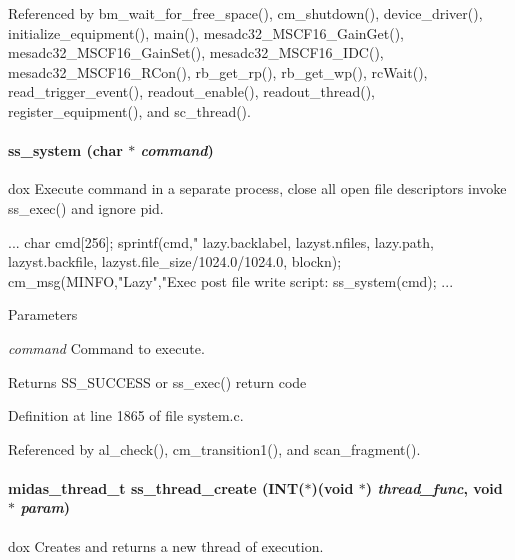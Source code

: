 Referenced by bm\_\-wait\_\-for\_\-free\_\-space(), cm\_\-shutdown(), device\_\-driver(), initialize\_\-equipment(), main(), mesadc32\_\-MSCF16\_\-GainGet(), mesadc32\_\-MSCF16\_\-GainSet(), mesadc32\_\-MSCF16\_\-IDC(), mesadc32\_\-MSCF16\_\-RCon(), rb\_\-get\_\-rp(), rb\_\-get\_\-wp(), rcWait(), read\_\-trigger\_\-event(), readout\_\-enable(), readout\_\-thread(), register\_\-equipment(), and sc\_\-thread().
\paragraph[{ss\_\-system}]{ ss\_\-system (char $\ast$ {\em command})}\hfill\label{group__msfunctionc_ga9b90d0865a3eb4720bd39edcaba9edba}
dox Execute command in a separate process, close all open file descriptors invoke ss\_\-exec() and ignore pid. 
\begin{DoxyCode}
{ ...
  char cmd[256];
  sprintf(cmd,"%
     lazy.backlabel, lazyst.nfiles, lazy.path, lazyst.backfile,
     lazyst.file_size/1024.0/1024.0, blockn);
  cm_msg(MINFO,"Lazy","Exec post file write script:%
  ss_system(cmd);
}
...
\end{DoxyCode}
 
\begin{DoxyParams}{Parameters}
\item[{\em command}]Command to execute. \end{DoxyParams}
\begin{DoxyReturn}{Returns}
SS\_\-SUCCESS or ss\_\-exec() return code 
\end{DoxyReturn}


Definition at line 1865 of file system.c.

Referenced by al\_\-check(), cm\_\-transition1(), and scan\_\-fragment().
\paragraph[{ss\_\-thread\_\-create}]{\setlength{\rightskip}{0pt plus 5cm}midas\_\-thread\_\-t ss\_\-thread\_\-create ({\bf INT}($\ast$)(void $\ast$) {\em thread\_\-func}, \/  void $\ast$ {\em param})}\hfill\label{group__msfunctionc_ga29342b1b9eaa66a0076dd0876090087d}
dox Creates and returns a new thread of execution.

